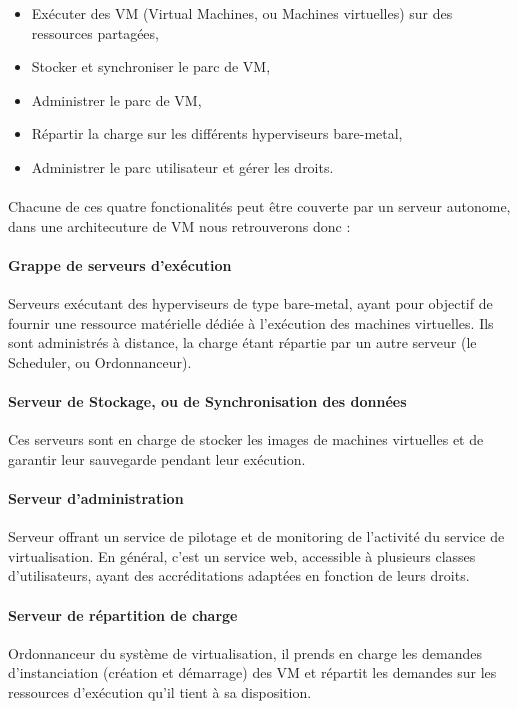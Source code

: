 \begin{itemize}
\item Exécuter des VM (Virtual Machines, ou Machines virtuelles) sur des
ressources partagées,
\item Stocker et synchroniser le parc de VM,
\item Administrer le parc de VM,
\item Répartir la charge sur les différents hyperviseurs bare-metal,
\item Administrer le parc utilisateur et gérer les droits.
\end{itemize} 

\paragraph{} Chacune de ces quatre fonctionalités peut être couverte par un serveur
autonome, dans une architecuture de VM nous retrouverons donc :

\paragraph{Grappe de serveurs d'exécution} Serveurs exécutant des hyperviseurs
de type bare-metal,  ayant pour objectif de fournir une ressource matérielle
dédiée à l'exécution des machines virtuelles. Ils sont administrés à distance,
la charge étant répartie par un autre serveur (le Scheduler, ou Ordonnanceur). 

\paragraph{Serveur de Stockage, ou de Synchronisation des données} Ces serveurs
sont en charge de stocker les images de machines virtuelles et de garantir leur
sauvegarde pendant leur exécution.

\paragraph{Serveur d'administration} Serveur offrant un service de pilotage et
de monitoring de l'activité du service de virtualisation. En général, c'est un
service web, accessible à plusieurs classes d'utilisateurs, ayant des
accréditations adaptées en fonction de leurs droits.

\paragraph{Serveur de répartition de charge} Ordonnanceur du système de
virtualisation, il prends en charge les demandes d'instanciation (création et
démarrage) des VM et répartit les demandes sur les ressources d'exécution qu'il
tient à sa disposition.

